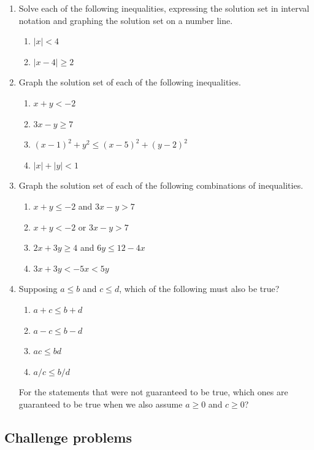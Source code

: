 \begin{enumerate}
\begin{enumerate}
\end{enumerate}
\item Solve each of the following inequalities, expressing the solution set in interval notation and graphing the solution set on a number line.
\begin{enumerate}
\item $\lvert x\rvert < 4$
\item $\lvert x - 4\rvert\geq 2$
\end{enumerate}
\item Graph the solution set of each of the following inequalities.
\begin{enumerate}
\item $x + y < -2$
\item $3x - y\geq 7$
\item $(x - 1)^2 + y^2\leq (x - 5)^2 + (y - 2)^2$
\item $\lvert x\rvert + \lvert y\rvert < 1$
\end{enumerate}
\item Graph the solution set of each of the following combinations of inequalities.
\begin{enumerate}
\item $x + y\leq -2$ and $3x - y > 7$
\item $x + y < -2$ or $3x - y > 7$
\item $2x + 3y\geq 4$ and $6y\leq 12 - 4x$
\item $3x + 3y < -5x < 5y$
\end{enumerate}
\item Supposing $a\leq b$ and $c\leq d$, which of the following must also be true?
\begin{enumerate}
\item $a + c\leq b + d$
\item $a - c\leq b - d$
\item $ac\leq bd$
\item $a/c\leq b/d$
\end{enumerate}
For the statements that were not guaranteed to be true, which ones are guaranteed to be true when we also assume $a\geq 0$ and $c\geq 0$?
\end{enumerate}


\subsection{Challenge problems}

